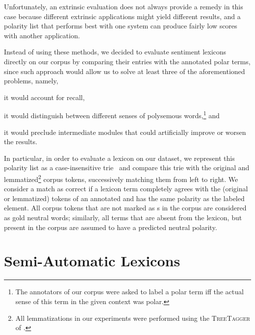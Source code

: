 Unfortunately, an extrinsic evaluation does not always provide a
remedy in this case because different extrinsic applications might
yield different results, and a polarity list that performs best with
one system can produce fairly low scores with another application.

Instead of using these methods, we decided to evaluate sentiment
lexicons directly on our corpus by comparing their entries with the
annotated polar terms, since such approach would allow us to solve at
least three of the aforementioned problems, namely,
\begin{inparaenum}[(i)]
  \item it would account for recall,
  \item it would distinguish between different senses of polysemous
    words,\footnote{The annotators of our corpus were asked to label a
      polar term iff the actual sense of this term in the given
      context was polar.} and
  \item it would preclude intermediate modules that could artificially
    improve or worsen the results.
\end{inparaenum}

In particular, in order to evaluate a lexicon on our dataset, we
represent this polarity list as a case-insensitive
trie~\cite[pp. 492--512]{Knuth:98} and compare this trie with the
original and lemmatized\footnote{All lemmatizations in our experiments
  were performed using the \textsc{TreeTagger} of \citet{Schmid:95}.}
corpus tokens, successively matching them from left to right.  We
consider a match as correct if a lexicon term completely agrees with
the (original or lemmatized) tokens of an annotated  and has the same polarity as the labeled element.  All corpus
tokens that are not marked as s in the corpus are
considered as gold neutral words; similarly, all terms that are absent
from the lexicon, but present in the corpus are assumed to have a
predicted neutral polarity.

\section{Semi-Automatic Lexicons}

